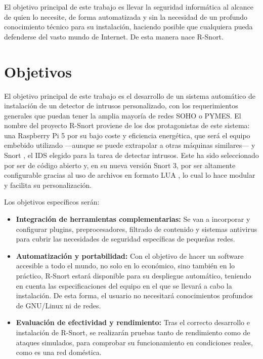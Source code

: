 \documentclass[11pt,a4paper,twoside]{report}
\begin{document}
El objetivo principal de este trabajo es llevar la seguridad informática al alcance de quien lo necesite, de forma automatizada y sin la necesidad de un profundo conocimiento técnico para su instalación, haciendo posible que cualquiera pueda defenderse del vasto mundo de Internet. De esta manera nace R-Snort.\newline

\section{Objetivos}
El objetivo principal de este trabajo es el desarrollo de un sistema automático de instalación de un detector de intrusos personalizado, con los requerimientos generales que puedan tener la amplia mayoría de redes SOHO o PYMES. El nombre del proyecto R-Snort proviene de los dos protagonistas de este sistema: una Raspberry Pi 5 \cite{rodriguez2018cluster} por su bajo coste y eficiencia energética, que será el equipo embebido utilizado —aunque se puede extrapolar a otras máquinas similares— y Snort \cite{roesch1999snort}, el IDS elegido para la tarea de detectar intrusos. Este ha sido seleccionado por ser de código abierto y, en su nueva versión Snort 3, por ser altamente configurable gracias al uso de archivos en formato LUA \cite{snort3_official}, lo cual lo hace modular y facilita su personalización.\newline

Los objetivos específicos serán:

\begin{itemize}
    \item \textbf{Integración de herramientas complementarias:} Se van a incorporar y configurar plugins, preprocesadores, filtrado de contenido y sistemas antivirus para cubrir las necesidades de seguridad específicas de pequeñas redes.
    
    \item \textbf{Automatización y portabilidad:} Con el objetivo de hacer un software accesible a todo el mundo, no solo en lo económico, sino también en lo práctico, R-Snort estará disponible para su despliegue automático, teniendo en cuenta las especificaciones del equipo en el que se llevará a cabo la instalación. De esta forma, el usuario no necesitará conocimientos profundos de GNU/Linux ni de redes.
    
    \item \textbf{Evaluación de efectividad y rendimiento:} Tras el correcto desarrollo e instalación de R-Snort, se realizarán pruebas tanto de rendimiento como de ataques simulados, para comprobar su funcionamiento en condiciones reales, como es una red doméstica.
    
\end{itemize}
\end{document}
